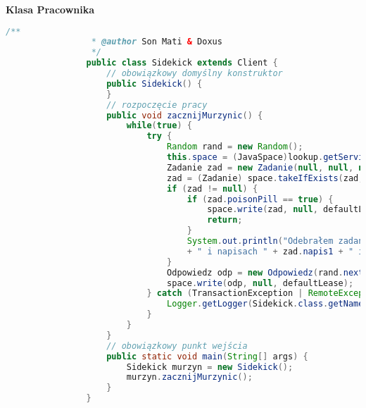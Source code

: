 			\newpage
			\textbf{Klasa Pracownika}
			\begin{lstlisting}[language=Java]
				/**
				 * @author Son Mati & Doxus
				 */
				public class Sidekick extends Client {
					// obowiązkowy domyślny konstruktor
					public Sidekick() {
					}
					// rozpoczęcie pracy
					public void zacznijMurzynic() {
						while(true) {
							try {
								Random rand = new Random();
								this.space = (JavaSpace)lookup.getService();
								Zadanie zad = new Zadanie(null, null, null, null);
								zad = (Zadanie) space.takeIfExists(zad, null, defaultLease);
								if (zad != null) {
									if (zad.poisonPill == true) {
										space.write(zad, null, defaultLease);
										return;
									}
									System.out.println("Odebrałem zadanie o id " + zad.liczba
									+ " i napisach " + zad.napis1 + " i " + zad.napis2);
								}
								Odpowiedz odp = new Odpowiedz(rand.nextInt(51), rand.nextInt(1000));
								space.write(odp, null, defaultLease);
							} catch (TransactionException | RemoteException | UnusableEntryException | InterruptedException ex) {
								Logger.getLogger(Sidekick.class.getName()).log(Level.SEVERE, null, ex);
							}
						}
					}
					// obowiązkowy punkt wejścia
					public static void main(String[] args) {
						Sidekick murzyn = new Sidekick();
						murzyn.zacznijMurzynic();
					}
				}
			\end{lstlisting}
	
	
	
	
	
	
	
	
	
	
	
	
	
	
	
	